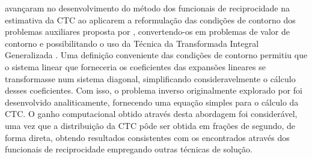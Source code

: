 \cite{artigo_padilha_3} avançaram no desenvolvimento do método dos funcionais de reciprocidade na estimativa da CTC ao aplicarem a reformulação das condições de contorno 
dos problemas auxiliares proposta por \cite{tese_abreu}, convertendo-os em problemas de valor de contorno e possibilitando o uso da Técnica da Transformada Integral Generalizada \citep{livro_integral_transforms_cotta}.
Uma definição conveniente das condições de contorno permitiu que o sistema linear que forneceria os coeficientes das expansões lineares se transformasse num sistema diagonal, simplificando
consideravelmente o cálculo desses coeficientes. Com isso, 
o problema inverso originalmente explorado por \cite{reciproc_3} foi desenvolvido analiticamente, fornecendo uma equação simples para o cálculo da CTC. O ganho
computacional obtido através desta abordagem foi considerável, uma vez que a distribuição da CTC pôde ser obtida em frações de segundo, de forma direta, obtendo resultados consistentes
com os encontrados através dos funcionais de reciprocidade empregando outras técnicas de solução.


